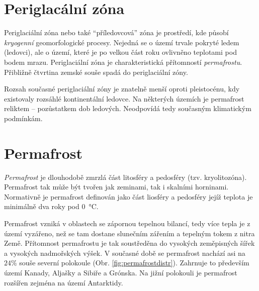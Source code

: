 \section{Periglacální zóna}
Periglaciální zóna nebo také \enquote{příledovcová} zóna je prostředí, kde působí \emph{kryogenní} geomorfologické procesy. Nejedná se o území trvale pokryté ledem (ledovci), ale o území, které je po velkou část roku ovlivněno teplotami pod bodem mrazu. Periglaciální zóna je charakteristická přítomností \emph{permafrostu}. Přibližně čtvrtina zemské souše spadá do periglaciální zóny. 

Rozsah současné periglaciální zóny je znatelně menší oproti pleistocénu, kdy existovaly rozsáhlé kontinentální ledovce. Na některých územích je permafrost reliktem -- pozůstatkem dob ledových. Neodpovídá tedy současným klimatickým podmínkám. 

\section{Permafrost}
\emph{Permafrost} je dlouhodobě zmrzlá část litosféry a pedosféry (tzv. kryolitozóna). Permafrost tak může být tvořen jak zeminami, tak i skalními horninami. Normativně je permafrost definován jako část liosféry a pedosféry jejíž teplota je minimálně dva roky pod \SI{0}{\degreeCelsius}. 

Permafrost vzniká v oblastech se zápornou tepelnou bilancí, tedy více tepla je z území vyzářeno, než se tam dostane slunečním zářením a tepelným tokem z nitra Země. Přítomnost permafrostu je tak soustředěna do vysokých zeměpisných šířek a vysokých nadmořských výšek. V současné době se permafrost nachází asi na $24 \%$ souše severní polokoule (Obr. \ref{fig:permafrostdistr}). Zahrnuje to především území Kanady, Aljašky a Sibiře a Grónska. Na jižní polokouli je permafrost rozšířen zejména na území Antarktidy.

